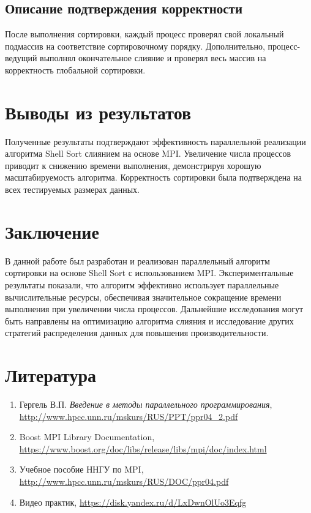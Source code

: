 \documentclass[12pt]{article}
\begin{document}
\subsection*{Описание подтверждения корректности}
\label{subsec:correctness_verification}
После выполнения сортировки, каждый процесс проверял свой локальный подмассив на соответствие сортировочному порядку. Дополнительно, процесс-ведущий выполнял окончательное слияние и проверял весь массив на корректность глобальной сортировки.

\section*{Выводы из результатов}
Полученные результаты подтверждают эффективность параллельной реализации алгоритма Shell Sort слиянием на основе MPI. Увеличение числа процессов приводит к снижению времени выполнения, демонстрируя хорошую масштабируемость алгоритма. Корректность сортировки была подтверждена на всех тестируемых размерах данных.

\section*{Заключение}
В данной работе был разработан и реализован параллельный алгоритм сортировки на основе Shell Sort с использованием MPI. Экспериментальные результаты показали, что алгоритм эффективно использует параллельные вычислительные ресурсы, обеспечивая значительное сокращение времени выполнения при увеличении числа процессов. Дальнейшие исследования могут быть направлены на оптимизацию алгоритма слияния и исследование других стратегий распределения данных для повышения производительности.

\section*{Литература}
\begin{enumerate}
    \item Гергель В.П. \textit{Введение в методы параллельного программирования}, \url{http://www.hpcc.unn.ru/mskurs/RUS/PPT/ppr04_2.pdf}
    \item Boost MPI Library Documentation, \url{https://www.boost.org/doc/libs/release/libs/mpi/doc/index.html}
    \item Учебное пособие ННГУ по MPI, \url{http://www.hpcc.unn.ru/mskurs/RUS/DOC/ppr04.pdf}
    \item Видео практик, \url{https://disk.yandex.ru/d/LxDwnOlUo3Eqfg}
\end{enumerate}
\end{document}
